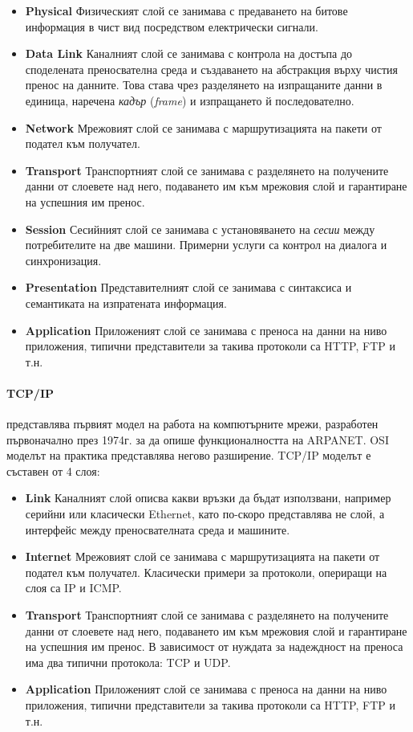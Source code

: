 \documentclass[12pt,a4paper,oneside]{book}
\begin{document}
\begin{itemize}
  \item \textbf{Physical} Физическият слой се занимава с предаването на битове
    информация в чист вид посредством електрически сигнали.
  \item \textbf{Data Link} Каналният слой се занимава с контрола на достъпа до
    споделената преносвателна среда и създаването на абстракция върху
    чистия пренос на данните. Това става чрез разделянето на
    изпращаните данни в единица, наречена \textit{кадър} (\textit{frame}) и изпращането й
    последователно.
  \item \textbf{Network} Мрежовият слой се занимава с маршрутизацията на
    пакети от подател към получател.
  \item \textbf{Transport} Транспортният слой се занимава с разделянето на
    получените данни от слоевете над него, подаването им към
    мрежовия слой и гарантиране на успешния им пренос.
  \item \textbf{Session} Сесийният слой се занимава с установяването на
    \textit{сесии} между потребителите на две машини. Примерни услуги са контрол
    на диалога и синхронизация.
  \item \textbf{Presentation} Представителният слой се занимава с синтаксиса и
    семантиката на изпратената информация.
  \item \textbf{Application} Приложеният слой се занимава с преноса на данни на
    ниво приложения, типични представители за такива протоколи са HTTP, FTP и
    т.н.
\end{itemize}


\paragraph{TCP/IP} представлява първият модел на работа на
компютърните мрежи, разработен първоначално през 1974г. за да опише
функционалността на ARPANET. OSI моделът на практика представлява негово
разширение. TCP/IP моделът е съставен от 4 слоя:

\begin{itemize}
  \item \textbf{Link} Каналният слой описва какви връзки да бъдат използвани,
    например серийни или класически Ethernet, като по-скоро представлява не
    слой, а интерфейс между преносвателната среда и машините.
  \item \textbf{Internet} Мрежовият слой се занимава с маршрутизацията на
    пакети от подател към получател. Класически примери за протоколи, опериращи
    на слоя са IP и ICMP.
  \item \textbf{Transport} Транспортният слой се занимава с разделянето на
    получените данни от слоевете над него, подаването им към
    мрежовия слой и гарантиране на успешния им пренос. В зависимост от нуждата
    за надеждност на преноса има два типични протокола: TCP и UDP.
  \item \textbf{Application} Приложеният слой се занимава с преноса на данни на
    ниво приложения, типични представители за такива протоколи са HTTP, FTP и
    т.н.
\end{itemize}
\end{document}
